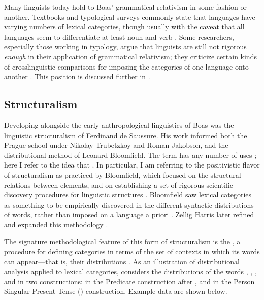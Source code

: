 Many linguists today hold to Boas' grammatical relativism in some fashion or another. Textbooks and typological surveys commonly state that languages have varying numbers of lexical categories, though usually with the caveat that all languages seem to differentiate at least noun and verb \parencite[e.g.][§6.2]{Velupillai2012}. Some researchers, especially those working in typology, argue that linguists are still not rigorous \emph{enough} in their application of grammatical relativism; they criticize certain kinds of crosslinguistic comparisons for imposing the categories of one language onto another \parencites{Croft2001b}{Gil2001}{Haspelmath2010a}{Haspelmath2012}{LaPolla2016}. This position is discussed further in .

\subsection{Structuralism}
\label{sec:2.2.3}

Developing alongside the early anthropological linguistics of Boas was the linguistic structuralism of Ferdinand de Saussure. His work informed both the Prague school under Nikolay Trubetzkoy and Roman Jakobson, and the distributional method of Leonard Bloomfield. The term  has any number of uses \parencite[Ch.~1]{Matthews2001}; here I refer to the idea that . In particular, I am referring to the positivistic flavor of structuralism as practiced by Bloomfield, which focused on the structural relations between elements, and on establishing a set of rigorous scientific discovery procedures for linguistic structures \parencite{Bloomfield1933}. Bloomfield saw lexical categories as something to be empirically discovered in the different syntactic distributions of words, rather than imposed on a language a priori \parencite[33]{Rauh2010}. Zellig Harris later refined and expanded this methodology \parencite{Harris1951}.

The signature methodological feature of this form of structuralism is the , a procedure for defining categories in terms of the set of contexts in which its words can appear—that is, their distributions \parencites[5]{Harris1951}[11]{Croft2001b}. As an illustration of distributional analysis applied to lexical categories, \textcite[11--12]{Croft1991} considers the distributions of the  words , , , and  in two constructions: in the Predicate construction after , and in the  Person Singular Present Tense () construction. Example data are shown below.

